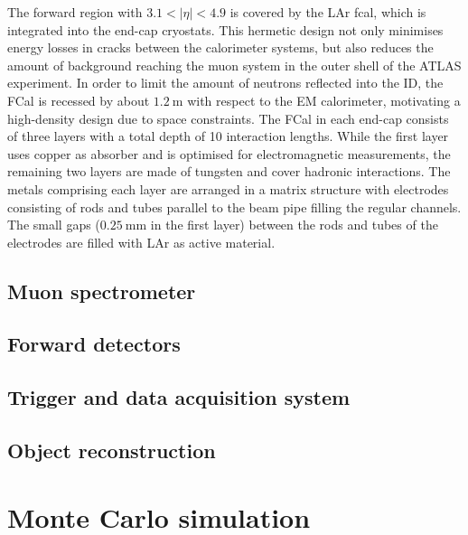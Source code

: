 The forward region with $3.1 < \vert\eta\vert <4.9$ is covered by the LAr \gls{fcal}, which is integrated into the end-cap cryostats. This hermetic design not only minimises energy losses in cracks between the calorimeter systems, but also reduces the amount of background reaching the muon system in the outer shell of the ATLAS experiment. In order to limit the amount of neutrons reflected into the ID, the FCal is recessed by about $\SI{1.2}{\meter}$ with respect to the EM calorimeter, motivating a high-density design due to space constraints. The FCal in each end-cap consists of three layers with a total depth of 10 interaction lengths. While the first layer uses copper as absorber and is optimised for electromagnetic measurements, the remaining two layers are made of tungsten and cover hadronic interactions. The metals comprising each layer are arranged in a matrix structure with electrodes consisting of rods and tubes parallel to the beam pipe filling the regular channels. The small gaps ($\SI{0.25}{\milli\meter}$ in the first layer) between the rods and tubes of the electrodes are filled with LAr as active material.

\subsection{Muon spectrometer}

\subsection{Forward detectors}

\subsection{Trigger and data acquisition system}

\subsection{Object reconstruction}


\section{Monte Carlo simulation}


